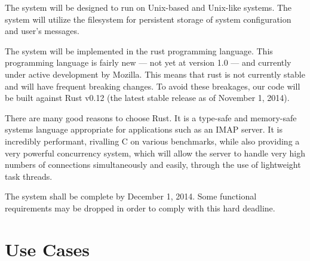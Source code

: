 \documentclass[a4paper,12pt]{article}
\begin{document}
The system will be designed to run on Unix-based and Unix-like systems. The system will utilize the filesystem for persistent storage of system configuration and user's messages.

The system will be implemented in the  rust programming language. This programming language is fairly new --- not yet at version 1.0 --- and currently under active development by Mozilla. This means that rust is not currently stable and will have frequent breaking changes. To avoid these breakages, our code will be built against Rust v0.12 (the latest stable release as of November 1, 2014).

There are many good reasons to choose Rust. It is a type-safe and memory-safe systems language appropriate for applications such as an IMAP server. It is incredibly performant, rivalling C on various benchmarks, while also providing a very powerful concurrency system, which will allow the server to handle very high numbers of connections simultaneously and easily, through the use of lightweight task threads.

The system shall be complete by December 1, 2014. Some functional requirements may be dropped in order to comply with this hard deadline.

\section*{Use Cases}
\end{document}
